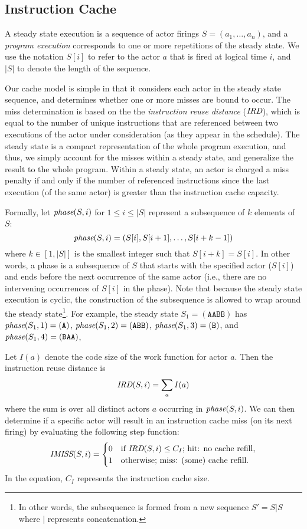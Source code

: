 \subsection{Instruction Cache}

A steady state execution is a sequence of actor firings
$S=(a_1,\ldots, a_n)$, and a
{\it program execution} corresponds to one or more repetitions of the
steady state. We use the notation $S[i]$ to refer to the
actor $a$ that is fired at logical time $i$, and $|S|$ to
denote the length of the sequence. 

Our cache model is simple in that it considers each actor in the
steady state sequence, and determines whether one or more misses are
bound to occur. The miss determination is based on the 
the {\it instruction reuse distance} ($\mbox{\it IRD}$), which is equal to
the number of unique instructions that are referenced between two
executions of the actor under consideration (as they appear in the
schedule). The steady state is a 
compact representation of the whole program execution, and thus, we
simply account for the misses within a steady state, and generalize
the result to the whole program. Within a steady state, an actor is
charged a miss penalty if and only if the number of referenced
instructions since the last execution (of the same actor)
is greater than the instruction cache capacity.

Formally, let $\mbox{\it phase}(S,i)$ for $1\le i\le|S|$ represent a
subsequence of $k$ elements of $S$:
\[ 
\mbox{\it phase}(S,i) = ( S[i], S[i+1], \ldots, S[i+k-1] )
\]
where $k\in[1,|S|]$ is the smallest integer such that $S[i+k]=S[i]$.
In other words, a phase is a subsequence of $S$ that starts with the
specified actor ($S[i]$) and ends before the next occurrence of the same actor
(i.e., there are no intervening occurrences of $S[i]$ in the phase).
Note that because the steady state
execution is cyclic, the construction of the subsequence is allowed to
wrap around the steady state\footnote{In other words, the subsequence
is formed from a new sequence $S'=S|S$ where $|$ represents
concatenation.}. For example, the steady state $S_1=(\texttt{AABB})$
has 
$\mbox{\it phase}(S_1,1)=(\texttt{A})$,
$\mbox{\it phase}(S_1,2)=(\texttt{ABB})$,
$\mbox{\it phase}(S_1,3)=(\texttt{B})$, and
$\mbox{\it phase}(S_1,4)=(\texttt{BAA})$,


Let $I(a)$ denote the code size of the work function for actor $a$.
Then the instruction reuse distance is
\[
\mbox{\it IRD}(S,i)=\sum_{a} I(a)
\]
where the sum is over all distinct actors $a$ occurring in
$\mbox{\it phase}(S,i)$. We can then determine if a specific actor will
result in an instruction cache miss (on its next firing) by evaluating
the following step function:
\begin{equation}
\label{eq:imiss}
  \mbox{\it IMISS}(S,i) =
    \begin{cases}
      0& \text{if $\mbox{\it IRD}(S,i) \leq C_I$; hit: no cache refill,}\\
      1& \text{otherwise; miss: (some) cache refill.}
    \end{cases}
\end{equation}
In the equation, $C_I$ represents the instruction cache size. 


